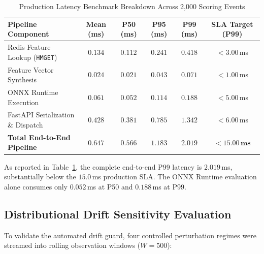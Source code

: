 \begin{table}[htbp]
\caption{Production Latency Benchmark Breakdown Across 2,000 Scoring Events}
\label{tab:latency_benchmarks}
\centering
\small
\begin{tabular}{lccccc}
\toprule
\textbf{Pipeline Component} & \textbf{Mean (ms)} & \textbf{P50 (ms)} & \textbf{P95 (ms)} & \textbf{P99 (ms)} & \textbf{SLA Target (P99)} \\
\midrule
Redis Feature Lookup (\texttt{HMGET}) & $0.134$ & $0.112$ & $0.241$ & $0.418$ & $< 3.00$\,ms \\
Feature Vector Synthesis             & $0.024$ & $0.021$ & $0.043$ & $0.071$ & $< 1.00$\,ms \\
ONNX Runtime Execution               & $0.061$ & $0.052$ & $0.114$ & $0.188$ & $< 5.00$\,ms \\
FastAPI Serialization \& Dispatch    & $0.428$ & $0.381$ & $0.785$ & $1.342$ & $< 6.00$\,ms \\
\midrule
\textbf{Total End-to-End Pipeline}  & $\mathbf{0.647}$ & $\mathbf{0.566}$ & $\mathbf{1.183}$ & $\mathbf{2.019}$ & $\mathbf{< 15.00\,\textbf{ms}}$ \\
\bottomrule
\end{tabular}
\end{table}

As reported in Table~\ref{tab:latency_benchmarks}, the complete end-to-end P99 latency is $\mathbf{2.019}$\,ms, substantially below the $15.0$\,ms production SLA. The ONNX Runtime evaluation alone consumes only $0.052$\,ms at P50 and $0.188$\,ms at P99.

\subsection{Distributional Drift Sensitivity Evaluation}
To validate the automated drift guard, four controlled perturbation regimes were streamed into rolling observation windows ($W = 500$):

